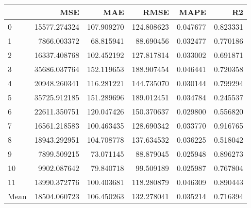 \begin{tabular}{lrrrrr}
\toprule
 & MSE & MAE & RMSE & MAPE & R2 \\
\midrule
0 & 15577.274324 & 107.909270 & 124.808623 & 0.047677 & 0.823331 \\
1 & 7866.003372 & 68.815941 & 88.690456 & 0.032477 & 0.770186 \\
2 & 16337.408768 & 102.452192 & 127.817814 & 0.033002 & 0.691871 \\
3 & 35686.037764 & 152.119653 & 188.907454 & 0.046441 & 0.720358 \\
4 & 20948.260341 & 116.281221 & 144.735070 & 0.030144 & 0.799294 \\
5 & 35725.912185 & 151.289696 & 189.012451 & 0.034784 & 0.245537 \\
6 & 22611.350751 & 120.047426 & 150.370637 & 0.029800 & 0.556820 \\
7 & 16561.218583 & 100.463435 & 128.690342 & 0.033770 & 0.916765 \\
8 & 18943.292951 & 104.708778 & 137.634532 & 0.036225 & 0.518042 \\
9 & 7899.509215 & 73.071145 & 88.879045 & 0.025948 & 0.896273 \\
10 & 9902.087642 & 79.840718 & 99.509189 & 0.025987 & 0.767804 \\
11 & 13990.372776 & 100.403681 & 118.280879 & 0.046309 & 0.890443 \\
Mean & 18504.060723 & 106.450263 & 132.278041 & 0.035214 & 0.716394 \\
\bottomrule
\end{tabular}
